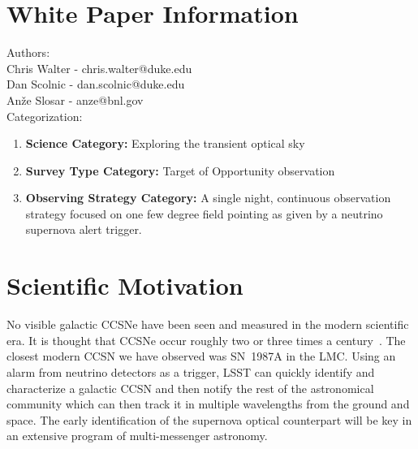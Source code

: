 \documentclass[11pt, letterpaper]{article}
\begin{document}
\newpage

\section{White Paper Information}

\noindent
Authors: \\

\noindent
Chris Walter - chris.walter@duke.edu \\
Dan Scolnic - dan.scolnic@duke.edu \\
An\v{z}e Slosar - anze@bnl.gov \\

\noindent
Categorization: 
\begin{enumerate} 
\item {\bf Science Category:}  Exploring the transient optical sky
\item {\bf Survey Type Category:}  Target of Opportunity observation
\item {\bf Observing Strategy Category:}  A single night, continuous
  observation strategy focused on one few degree field pointing as given by
  a neutrino supernova alert trigger.
\end{enumerate}  

\clearpage

\section{Scientific Motivation}
\label{sec:motivation}

No visible galactic CCSNe have been seen and measured in the modern
scientific era. It is thought that CCSNe occur roughly two or three
times a century~\cite{1994ApJS...92..487T, 2001ASSL..264..199C}.  The
closest modern CCSN we have observed was SN~1987A in the LMC.  Using an
alarm from neutrino detectors as a trigger, LSST can quickly identify
and characterize a galactic CCSN and then notify the rest of the
astronomical community which can then track it in multiple wavelengths
from the ground and space.  The early identification of the supernova
optical counterpart will be key in an extensive program of
multi-messenger astronomy.
\end{document}
